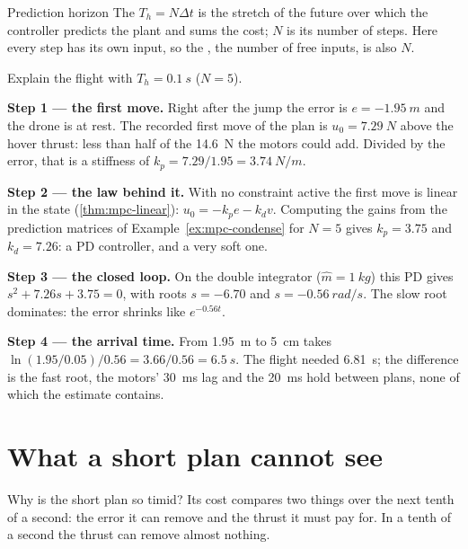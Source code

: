 \begin{definition}{Prediction horizon}
The  $T_h = N\Delta t$ is the stretch of the future over which the controller predicts the plant and sums the cost; $N$ is its number of steps. Here every step has its own input, so the , the number of free inputs, is also $N$.
\end{definition}

\begin{example}
\label{ex:horizon-short}
Explain the flight with $T_h = \SI{0.1}{s}$ ($N = 5$).

\textbf{Step 1 — the first move.} Right after the jump the error is $e = \SI{-1.95}{m}$ and the drone is at rest. The recorded first move of the plan is $u_0 = \SI{7.29}{N}$ above the hover thrust: less than half of the \SI{14.6}{N} the motors could add. Divided by the error, that is a stiffness of $k_p = 7.29/1.95 = \SI{3.74}{N/m}$.

\textbf{Step 2 — the law behind it.} With no constraint active the first move is linear in the state (\cref{thm:mpc-linear}): $u_0 = -k_p e - k_d v$. Computing the gains from the prediction matrices of Example~\ref{ex:mpc-condense} for $N = 5$ gives $k_p = 3.75$ and $k_d = 7.26$: a PD controller, and a very soft one.

\textbf{Step 3 — the closed loop.} On the double integrator ($\hat m = \SI{1}{kg}$) this PD gives $s^2 + 7.26s + 3.75 = 0$, with roots $s = -6.70$ and $s = \SI{-0.56}{rad/s}$. The slow root dominates: the error shrinks like $e^{-0.56t}$.

\textbf{Step 4 — the arrival time.} From \SI{1.95}{m} to \SI{5}{cm} takes $\ln(1.95/0.05)/0.56 = 3.66/0.56 = \SI{6.5}{s}$. The flight needed \SI{6.81}{s}; the difference is the fast root, the motors' \SI{30}{ms} lag and the \SI{20}{ms} hold between plans, none of which the estimate contains.
\end{example}

\section{What a short plan cannot see}

Why is the short plan so timid? Its cost compares two things over the next tenth of a second: the error it can remove and the thrust it must pay for. In a tenth of a second the thrust can remove almost nothing.

